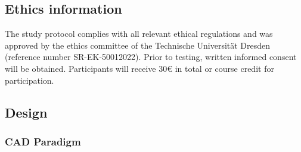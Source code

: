 \documentclass[
  man,floatsintext]{apa6}
\begin{document}
\hypertarget{ethics-information}{%
\subsection{Ethics information}\label{ethics-information}}

The study protocol complies with all relevant ethical regulations and was approved by the ethics committee of the Technische Universität Dresden (reference number SR-EK-50012022).
Prior to testing, written informed consent will be obtained.
Participants will receive 30€ in total or course credit for participation.

\hypertarget{design}{%
\subsection{Design}\label{design}}

\hypertarget{cad-paradigm}{%
\subsubsection{CAD Paradigm}\label{cad-paradigm}}
\end{document}
